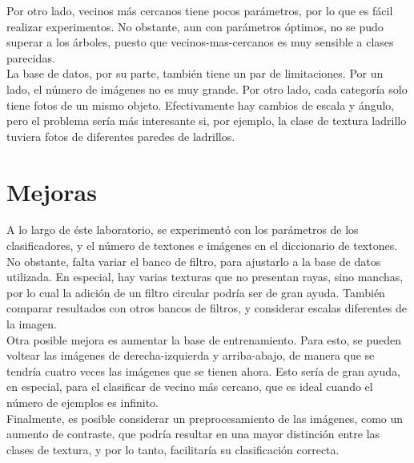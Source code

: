 \documentclass[10pt,twocolumn,letterpaper]{article}
\begin{document}
Por otro lado, vecinos más cercanos tiene pocos parámetros, por lo que es fácil realizar experimentos. No obstante, aun con parámetros óptimos, no se pudo superar a los árboles, puesto que vecinos-mas-cercanos es muy sensible a clases parecidas.\\

La base de datos, por su parte, también tiene un par de limitaciones. Por un lado, el número de imágenes no es muy grande. Por otro lado, cada categoría solo tiene fotos de un mismo objeto. Efectivamente hay cambios de escala y ángulo, pero el problema sería más interesante si, por ejemplo, la clase de textura ladrillo tuviera fotos de diferentes paredes de ladrillos.\\

\section{Mejoras}
A lo largo de éste laboratorio, se experimentó con los parámetros de los clasificadores, y el número de textones e imágenes en el diccionario de textones. No obstante, falta variar el banco de filtro, para ajustarlo a la base de datos utilizada. En especial, hay varias texturas que no presentan rayas, sino manchas, por lo cual la adición de un filtro circular podría ser de gran ayuda. También comparar resultados con otros bancos de filtros, y considerar escalas diferentes de la imagen.\\

Otra posible mejora es aumentar la base de entrenamiento. Para esto, se pueden voltear las imágenes de derecha-izquierda y arriba-abajo, de manera que se tendría cuatro veces las imágenes que se tienen ahora. Esto sería de gran ayuda, en especial, para el clasificar de vecino más cercano, que es ideal cuando el número de ejemplos es infinito.\\

Finalmente, es posible considerar un preprocesamiento de las imágenes, como un aumento de contraste, que podría resultar en una mayor distinción entre las clases de textura, y por lo tanto, facilitaría su clasificación correcta.

{\small


}
\end{document}
